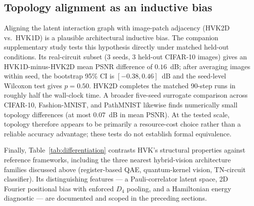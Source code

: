 \documentclass[pdflatex,sn-basic]{sn-jnl}
\begin{document}
\subsection{Topology alignment as an inductive bias}
\label{sec:topology}

Aligning the latent interaction graph with image-patch adjacency (HVK2D vs.\
HVK1D) is a plausible architectural inductive bias. The companion supplementary
study tests this hypothesis directly under matched held-out conditions. Its
real-circuit subset (3 seeds, 3 held-out CIFAR-10 images) gives an
HVK1D-minus-HVK2D mean PSNR difference of $0.16$~dB; after averaging images
within seed, the bootstrap 95\% CI is $[-0.38,0.46]$~dB and the seed-level
Wilcoxon test gives $p=0.50$. HVK2D completes the matched 90-step runs in roughly
half the wall-clock time. A broader five-seed surrogate comparison across
CIFAR-10, Fashion-MNIST, and PathMNIST likewise finds numerically small topology
differences (at most $0.07$~dB in mean PSNR). At the tested scale, topology
therefore appears to be primarily a resource-cost choice rather than a reliable
accuracy advantage; these tests do not establish formal equivalence.

Finally, Table~\ref{tab:differentiation} contrasts HVK's structural properties
against reference frameworks, including the three nearest hybrid-vision
architecture families discussed above (register-based QAE, quantum-kernel vision,
TN-circuit classifier). Its distinguishing features --- a Pauli-correlator latent
space, 2D Fourier positional bias with enforced $D_4$ pooling, and a Hamiltonian
energy diagnostic --- are documented and scoped in the preceding sections.
\end{document}
